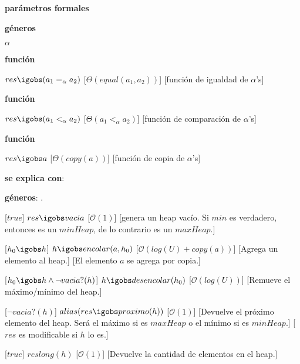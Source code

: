 \begin{Interfaz}
  \textbf{parámetros formales}\parindent\\
  \parbox{1.7cm}{\textbf{géneros}}$\alpha$\\
  \parbox[t]{1.7cm}{\textbf{función}}\parbox[t]{.5\textwidth-\parindent-1.7cm}{%
    {$res \igobs (a_1 =_{\alpha} a_2)$}
    [$\Theta(equal(a_1, a_2))$]
    [función de igualdad de $\alpha$'s]
  }
  \parbox[t]{1.7cm}{\textbf{función}}\parbox[t]{.5\textwidth-\parindent-1.7cm}{%
    {$res \igobs (a_1 <_{\alpha} a_2)$}
    [$\Theta(a_1 <_{\alpha} a_2)$]
    [función de comparación de $\alpha$'s]
  }
  \parbox[t]{1.7cm}{\textbf{función}}\parbox[t]{.5\textwidth-\parindent-1.7cm}{%
    {$res \igobs a$}
    [$\Theta(copy(a))$]
    [función de copia de $\alpha$'s]
  }

  \textbf{se explica con}: 

  \textbf{géneros}: .


    [$true$]
    {$res \igobs vacia$}
    [$\mathcal{O}(1)$]
    [genera un heap vacío. Si $min$ es verdadero, entonces es un $minHeap$, de lo contrario es un $maxHeap$.]

    [$h_0 \igobs h$]
    {$h \igobs encolar(a, h_0)$}
    [$\mathcal{O}(log(U) + copy(a))$]
    [Agrega un elemento al heap.]
    [El elemento $a$ se agrega por copia.]

    [$h_0 \igobs h \wedge \neg vacia?(h)$]
    {$h \igobs desencolar(h_0)$}
    [$\mathcal{O}(log(U))$]
    [Remueve el máximo/mínimo del heap.]

    [$\neg vacia?(h)$]
    {$ alias(res \igobs proximo(h)) $}
    [$\mathcal{O}(1)$]
    [Devuelve el próximo elemento del heap. Será el máximo si es $maxHeap$ o el mínimo si es $minHeap$.]
    [$res$ es modificable si $h$ lo es.]

    [$true$]
    {$res $\igobs$ long(h)$}
    [$\mathcal{O}(1)$]
    [Devuelve la cantidad de elementos en el heap.]


\end{Interfaz}
